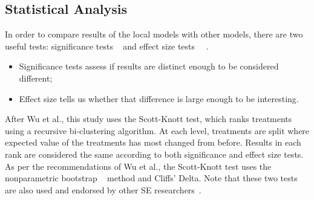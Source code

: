 \documentclass[sigconf]{acmart}
\newcommand{\bi}{\begin{itemize}[leftmargin=0.4cm]}
\newcommand{\ei}{\end{itemize}}
\theoremstyle{break}
\begin{document}
    \subsection{Statistical Analysis}
    \label{sssec:Statistical Analysis}
    In order to compare results of the local models with other models, there are two useful tests: significance tests ~\cite{bentler1980significance} and effect size tests ~\cite{rosenthal1994parametric}~\cite{chen2002correlation}.
   \bi
   \item
  Significance tests assess if  results are distinct enough to be considered different;
  \item
  Effect size tells us whether that difference is large enough to be  interesting. 
  \ei
  After Wu et al.,  this study uses the Scott-Knott test, which ranks treatments using a recursive bi-clustering algorithm. At each level, treatments are split where expected value of the treatments has most changed from before. Results in each rank are considered the same according to both significance and effect size tests. As per the recommendations of Wu et al., the Scott-Knott test uses the nonparametric bootstrap ~\cite{efron1982jackknife} method and Cliffs' Delta. Note that these two tests are also used and endorsed by other SE
  researchers~\cite{ghotra2015revisiting}.
\end{document}
